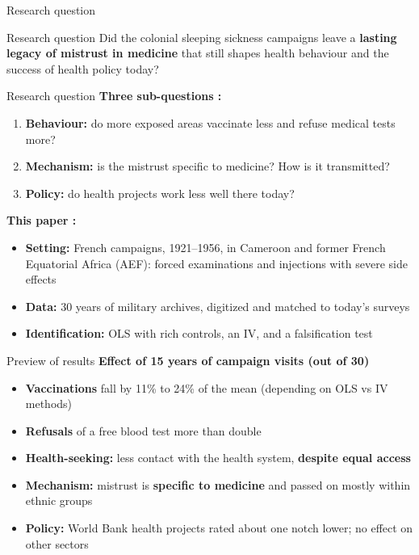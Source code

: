 \documentclass[aspectratio=1610]{beamer}
\newcommand{\highlight}[1]{\textcolor{accent}{\textbf{#1}}}
\begin{document}
\begin{frame}{Research question}
  \begin{block}{Research question}
    Did the colonial sleeping sickness campaigns leave a \textbf{lasting legacy of mistrust in medicine}
    that still shapes health behaviour and the success of health policy today?
  \end{block}
\end{frame}


\begin{frame}{Research question}
\textbf{Three sub-questions :}
      \begin{enumerate}
        \item \textbf{Behaviour:} do more exposed areas vaccinate less and refuse medical tests more?
        \item \textbf{Mechanism:} is the mistrust specific to medicine? How is it transmitted?
        \item \textbf{Policy:} do health projects work less well there today?
      \end{enumerate}
      \vspace{0.3em}
      \textbf{This paper :}
      \begin{itemize}
        \item \textbf{Setting:} French campaigns, 1921--1956, in Cameroon and former French Equatorial
          Africa (AEF): forced examinations and injections with severe side effects
        \item \textbf{Data:} 30 years of military archives, digitized and matched to today's surveys
        \item \textbf{Identification:} OLS with rich controls, an IV, and a falsification test
      \end{itemize}
\end{frame}

\begin{frame}{Preview of results}
  \textbf{Effect of 15 years of campaign visits (out of 30)}
      \begin{itemize}
        \item \textbf{Vaccinations} fall by 11\% to 24\% of the mean (depending on OLS vs IV methods)
        \item \textbf{Refusals} of a free blood test more than double
        \item \textbf{Health-seeking:} less contact with the health system,  \highlight{despite equal access}
        \item \textbf{Mechanism:} mistrust is \highlight{specific to medicine} and passed on mostly within ethnic groups
        \item \textbf{Policy:} World Bank health projects rated about one notch lower;
          no effect on other sectors
      \end{itemize}
\end{frame}
\end{document}

